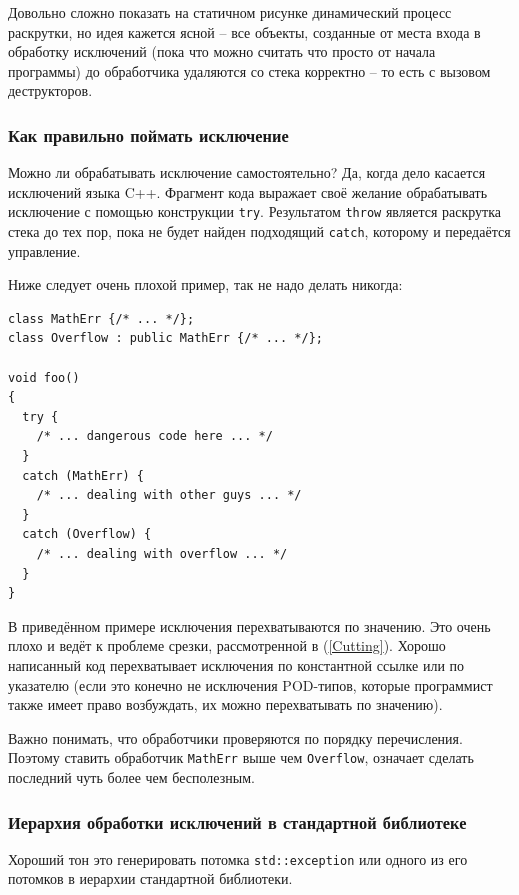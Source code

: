 \documentclass[a4paper,12pt,oneside]{article}
\begin{document}
Довольно сложно показать на статичном рисунке динамический процесс раскрутки, но идея кажется ясной -- все объекты, созданные от места входа в обработку исключений (пока что можно считать что просто от начала программы) до обработчика удаляются со стека корректно -- то есть с вызовом деструкторов.

\subsubsection{Как правильно поймать исключение}\label{CatchException}

Можно ли обрабатывать исключение самостоятельно? Да, когда дело касается исключений языка C++. Фрагмент кода выражает своё желание обрабатывать исключение с помощью конструкции \lstinline!try!. Результатом \lstinline!throw! является раскрутка стека до тех пор, пока не будет найден подходящий \lstinline!catch!, которому и передаётся управление.

Ниже следует очень плохой пример, так не надо делать никогда:

\begin{lstlisting}
class MathErr {/* ... */};
class Overflow : public MathErr {/* ... */};

void foo()
{
  try {
    /* ... dangerous code here ... */
  }
  catch (MathErr) {
    /* ... dealing with other guys ... */
  }
  catch (Overflow) {
    /* ... dealing with overflow ... */
  }
}
\end{lstlisting}

В приведённом примере исключения перехватываются по значению. Это очень плохо и ведёт к проблеме срезки, рассмотренной в (\ref{Cutting}). Хорошо написанный код перехватывает исключения по константной ссылке или по указателю (если это конечно не исключения POD-типов, которые программист также имеет право возбуждать, их можно перехватывать по значению).

Важно понимать, что обработчики проверяются по порядку перечисления. Поэтому ставить обработчик \lstinline!MathErr! выше чем \lstinline!Overflow!, означает сделать последний чуть более чем бесполезным.

\pagebreak
\subsubsection{Иерархия обработки исключений в стандартной библиотеке}\label{ExceptionHierarchy}

Хороший тон это генерировать потомка \lstinline!std::exception! или одного из его потомков в иерархии стандартной библиотеки.
\end{document}
